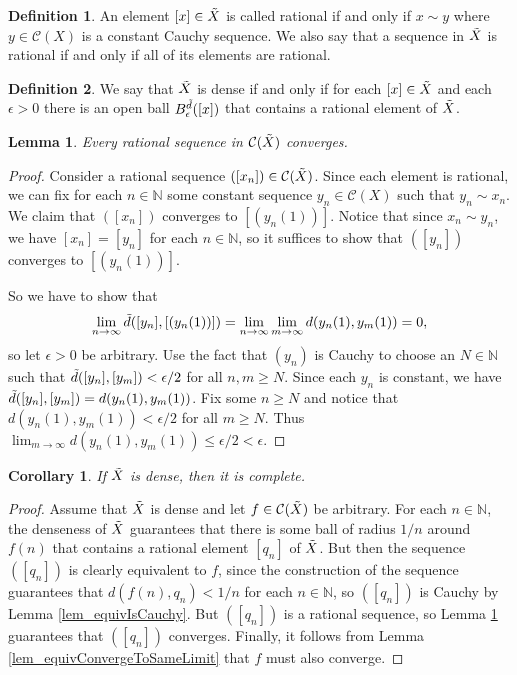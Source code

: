 \documentclass{article}
\newtheorem{lemma}{Lemma}[subsection]
\newtheorem{corollary}{Corollary}[subsection]
\theoremstyle{definition}
\newtheorem{definition}{Definition}[subsection]
\theoremstyle{remark}
\newcommand{\N}{\mathbb{N}}
\newcommand{\prt}[1]{\mathcal{#1}}
\begin{document}
\begin{definition}
   An element $[x] \in \Tilde{X}$ is called rational if and only if $x \sim y$ where $y \in \prt{C}(X)$ is a constant Cauchy sequence. We also say that a sequence in $\Tilde{X}$ is rational if and only if all of its elements are rational.
\end{definition}

\begin{definition}
   We say that $\Tilde{X}$ is dense if and only if for each $[x] \in \Tilde{X}$ and each $\epsilon > 0$ there is an open ball $B^{\Tilde{d}}_\epsilon([x])$ that contains a rational element of $\Tilde{X}$.
\end{definition}

\begin{lemma} \label{lem_rationalSequencesConverge}
    Every rational sequence in $\prt{C}(\Tilde{X})$ converges.
\end{lemma}

\begin{proof}
    Consider a rational sequence $([x_n]) \in \prt{C}(\Tilde{X})$. Since each element is rational, we can fix for each $n \in \N$ some constant sequence $y_n \in \prt{C}(X)$ such that $y_n \sim x_n$. We claim that $([x_n])$ converges to $[(y_n(1))]$. Notice that since $x_n \sim y_n$, we have $[x_n] = [y_n]$ for each $n \in \N$, so it suffices to show that $([y_n])$ converges to $[(y_n(1))]$.
    
    So we have to show that 
    \begin{equation*}
        \lim_{n \to \infty} \Tilde{d}([y_n], [(y_n(1))]) = \lim_{n \to \infty} \lim_{m \to \infty} 
        d(y_n(1), y_m(1)) = 0,
    \end{equation*} so let $\epsilon > 0$ be arbitrary. Use the fact that $(y_n)$ is Cauchy to choose an $N \in \N$ such that $\Tilde{d}([y_n], [y_m]) < \epsilon/2$ for all $n,m \geq N$. Since each $y_n$ is constant, we have $\Tilde{d}([y_n], [y_m]) = d(y_n(1), y_m(1))$. Fix some $n \geq N$ and notice that $d(y_n(1), y_m(1)) < \epsilon/2$ for all $m \geq N$. Thus $\lim_{m \to \infty} d(y_n(1), y_m(1)) \leq \epsilon/2 < \epsilon$.
    
\end{proof}

\begin{corollary}
    If $\Tilde{X}$ is dense, then it is complete.
\end{corollary}

\begin{proof}
    Assume that $\Tilde{X}$ is dense and let $f \in \prt{C}(\Tilde{X})$ be arbitrary. For each $n \in \N$, the denseness of $\Tilde{X}$ guarantees that there is some ball of radius $1/n$ around $f(n)$ that contains a rational element $[q_n]$ of $\Tilde{X}$. But then the sequence $([q_n])$ is clearly equivalent to $f$, since the construction of the sequence guarantees that $d(f(n), q_n) < 1/n$ for each $n \in \N$, so $([q_n])$ is Cauchy by Lemma \ref{lem_equivIsCauchy}. But $([q_n])$ is a rational sequence, so Lemma \ref{lem_rationalSequencesConverge} guarantees that $([q_n])$ converges. Finally, it follows from Lemma \ref{lem_equivConvergeToSameLimit} that $f$ must also converge.
\end{proof}
\end{document}
